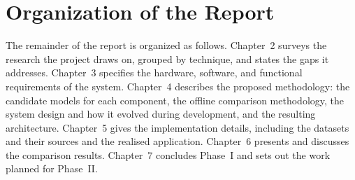 \section{Organization of the Report}
The remainder of the report is organized as follows. Chapter~2 surveys the research the project draws on, grouped by technique, and states the gaps it addresses. Chapter~3 specifies the hardware, software, and functional requirements of the system. Chapter~4 describes the proposed methodology: the candidate models for each component, the offline comparison methodology, the system design and how it evolved during development, and the resulting architecture. Chapter~5 gives the implementation details, including the datasets and their sources and the realised application. Chapter~6 presents and discusses the comparison results. Chapter~7 concludes Phase~I and sets out the work planned for Phase~II.
